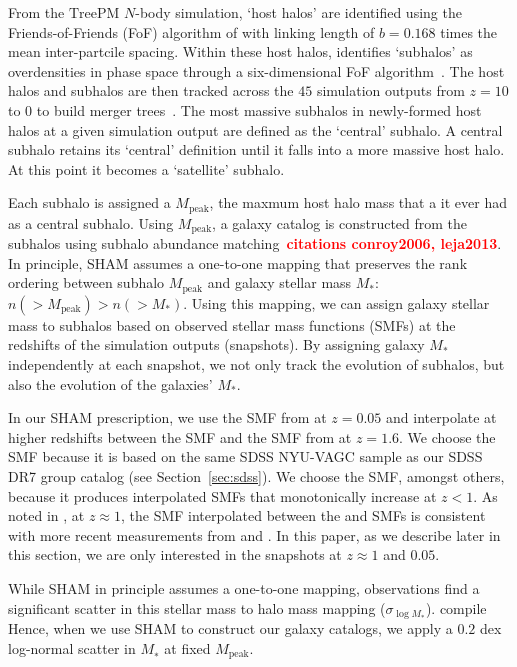 \documentclass[12pt, letterpaper, preprint]{aastex}
\newcommand{\todo}[1]{{\bf \textcolor{red}{#1}}}
\begin{document}
From the $\mathrm{TreePM}$ $N$-body simulation, `host halos' are identified using the
Friends-of-Friends (FoF) algorithm of \cite{davis1985} with linking length of $b = 0.168$
times the mean inter-partcile spacing. Within these host halos, \cite{wetzel2013} identifies  
`subhalos' as overdensities in phase space through a six-dimensional FoF 
algorithm~\citep[FoF6D][]{white2010}. The host halos and subhalos are then tracked across 
the $45$ simulation outputs from $z = 10$ to $0$ to build merger trees~\citep{wetzel2009,wetzel2010}. 
The most massive subhalos in newly-formed host halos at a given simulation output are defined 
as the `central' subhalo. A central subhalo retains its `central' definition until it falls into 
a more massive host halo. At this point it becomes a `satellite' subhalo. 

Each subhalo is assigned a $M_\mathrm{peak}$, the maxmum host halo mass that a it ever had 
as a central subhalo. Using $M_\mathrm{peak}$, a galaxy catalog is constructed from 
the subhalos using subhalo abundance matching~\citep[SHAM;][]{vale2006,yang2009,wetzel2012,wetzel2013,wetzel2014,hahn2017a}\todo{citations conroy2006, leja2013}. 
In principle, SHAM assumes a one-to-one mapping that preserves the rank ordering between subhalo $M_\mathrm{peak}$
and galaxy stellar mass $M_*$: $n(> M_\mathrm{peak}) > n(> M_*)$. Using this mapping, we can 
assign galaxy stellar mass to subhalos based on observed stellar mass functions (SMFs) at the
redshifts of the simulation outputs (snapshots). By assigning galaxy $M_*$ independently at each 
snapshot, we not only track the evolution of subhalos, but also the evolution of the galaxies' $M_*$. 

In our SHAM prescription, we use the SMF from \cite{li2009} at $z = 0.05$ and interpolate at
higher redshifts between the \cite{li2009} SMF and the SMF from \cite{marchesini2009} at 
$z = 1.6$. We choose the \cite{li2009} SMF because it is based on the same SDSS NYU-VAGC 
sample as our SDSS DR7 group catalog (see Section~\ref{sec:sdss}). We choose the 
\cite{marchesini2009} SMF, amongst others, because it produces interpolated SMFs that
monotonically increase at $z < 1$. As noted in \cite{hahn2017}, 
at $z \approx 1$, the SMF interpolated between the \cite{li2009} and \cite{marchesini2009} 
SMFs is consistent with more recent measurements from \cite{muzzin2013} and \cite{ilbert2013}. 
In this paper, as we describe later in this section, we are only interested in the snapshots 
at $z \approx 1$ and $0.05$. 

While SHAM in principle assumes a one-to-one mapping, observations find a significant
scatter in this stellar mass to halo mass mapping ($\sigma_{\log M_*}$). \cite{gu2016} 
compile 
Hence, when we use SHAM to construct our galaxy catalogs, we apply a $0.2$ dex log-normal 
scatter in $M_∗$ at fixed $M_\mathrm{peak}$. 
\end{document}
